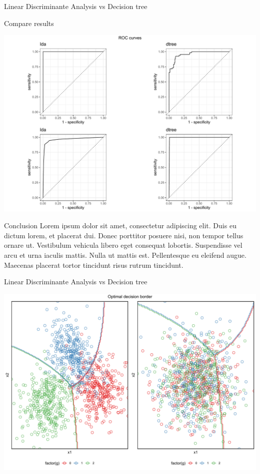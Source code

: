 \documentclass[
  ignorenonframetext,
]{article}
\begin{document}
\begin{frame}[fragile]{Linear Discriminante Analysis vs Decision tree}
\begin{block}{Compare results}
\begin{center}\includegraphics{_main_files/figure-beamer/unnamed-chunk-31-1} \end{center}
\end{block}

\begin{block}{Conclusion}
\protect\hypertarget{conclusion-1}{}
Lorem ipsum dolor sit amet, consectetur adipiscing elit. Duis eu dictum lorem, et placerat dui. Donec porttitor posuere nisi, non tempor tellus ornare ut. Vestibulum vehicula libero eget consequat lobortis. Suspendisse vel arcu et urna iaculis mattis. Nulla ut mattis est. Pellentesque eu eleifend augue. Maecenas placerat tortor tincidunt risus rutrum tincidunt.
\end{block}
\end{frame}

\begin{frame}{Linear Discriminante Analysis vs Decision tree}
\protect\hypertarget{linear-discriminante-analysis-vs-decision-tree-1}{}
\begin{center}\includegraphics{_main_files/figure-beamer/unnamed-chunk-37-1} \end{center}
\end{frame}
\end{document}
